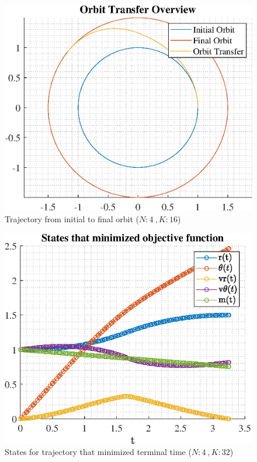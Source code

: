 \documentclass[]{article}
\begin{document}
\begin{figure}
	\centering
	\includegraphics[scale=0.75]{orbit_N4_K16_C2_tf.eps}
	\caption{Trajectory from initial to final orbit (\(N:4\ , K:16\))}
	\label{fig:orbit_N4_K16_C2_tf}
\end{figure}
\begin{figure}
	\centering
	\includegraphics[scale=0.75]{states_N4_K32_C2_tf.eps}
	\caption{States for trajectory that minimized terminal time (\(N:4\ , K:32\))}
	\label{fig:states_N4_K32_C2_tf}
\end{figure}
\end{document}
